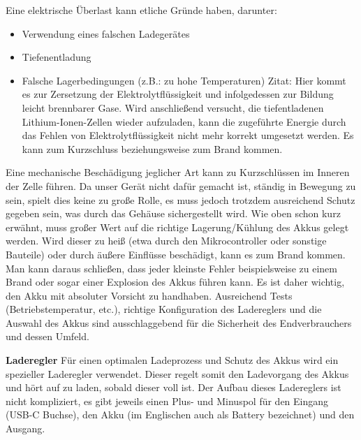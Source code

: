 \documentclass[11pt, twoside]{article}
\begin{document}
Eine elektrische Überlast kann etliche Gründe haben, darunter: 
\begin{itemize}
	\item Verwendung eines falschen Ladegerätes
	\item Tiefenentladung
	\item Falsche Lagerbedingungen (z.B.: zu hohe Temperaturen) 
\newline
Zitat: \glqq Hier kommt es zur Zersetzung der Elektrolytflüssigkeit und infolgedessen zur Bildung leicht brennbarer Gase. Wird anschließend versucht, die tiefentladenen Lithium-Ionen-Zellen wieder aufzuladen, kann die zugeführte Energie durch das Fehlen von Elektrolytflüssigkeit nicht mehr korrekt umgesetzt werden. Es kann zum Kurzschluss beziehungsweise zum Brand kommen.\grqq{} \parencite[][]{noauthor_urlnl11_nodate}
\end{itemize}
Eine mechanische Beschädigung jeglicher Art kann zu Kurzschlüssen im Inneren der Zelle führen. Da unser Gerät nicht dafür gemacht ist, ständig in Bewegung zu sein, spielt dies keine zu große Rolle, es muss jedoch trotzdem ausreichend Schutz gegeben sein, was durch das Gehäuse sichergestellt wird.
\vspace{4mm}\newline
Wie oben schon kurz erwähnt, muss großer Wert auf die richtige Lagerung/Kühlung des Akkus gelegt werden. Wird dieser zu heiß (etwa durch den Mikrocontroller oder sonstige Bauteile) oder durch äußere Einflüsse beschädigt, kann es zum Brand kommen.
\vspace{4mm}\newline
Man kann daraus schließen, dass jeder kleinste Fehler beispielsweise zu einem Brand oder sogar einer Explosion des Akkus führen kann. Es ist daher wichtig, den Akku mit absoluter Vorsicht zu handhaben. Ausreichend Tests (Betriebstemperatur, etc.), richtige Konfiguration des Ladereglers und die Auswahl des Akkus sind ausschlaggebend für die Sicherheit des Endverbrauchers und dessen Umfeld.

\parencite[vgl.][]{noauthor_urlnl11_nodate}

\textbf{Laderegler}\newline
Für einen optimalen Ladeprozess und Schutz des Akkus wird ein spezieller Laderegler verwendet. Dieser regelt somit den Ladevorgang des Akkus und hört auf zu laden, sobald dieser voll ist. Der Aufbau dieses Ladereglers ist nicht kompliziert, es gibt jeweils einen Plus- und Minuspol für den Eingang (USB-C Buchse), den Akku (im Englischen auch als Battery bezeichnet) und den Ausgang.
\end{document}
